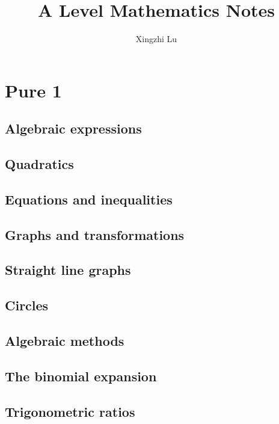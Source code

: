 \documentclass[oneside,fleqn,11pt]{book}
\title{A Level Mathematics Notes}
\author{Xingzhi Lu}
\date{}
\begin{document}
\everymath{\displaystyle}
\maketitle
\tableofcontents

\part{Pure 1}
\chapter{Algebraic expressions}


\chapter{Quadratics}


\chapter{Equations and inequalities}


\chapter{Graphs and transformations}


\chapter{Straight line graphs}


\chapter{Circles}


\chapter{Algebraic methods}


\chapter{The binomial expansion}


\chapter{Trigonometric ratios}

\end{document}
